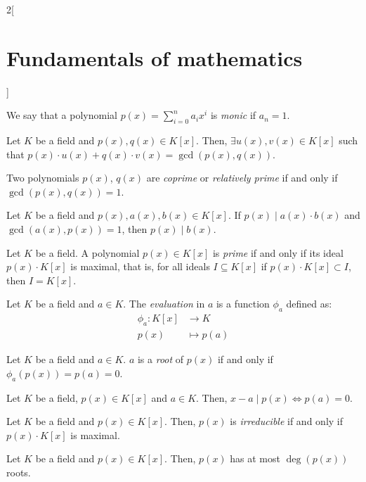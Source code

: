 \documentclass[../../../main.tex]{subfiles}
\begin{document}
\begin{multicols}{2}[\section{Fundamentals of mathematics}]
\begin{definition}
  \end{definition}
  \begin{definition}
    We say that a polynomial $p(x)=\sum_{i=0}^na_ix^i$ is \emph{monic} if $a_n=1$.
  \end{definition}
  \begin{theorem}
    Let $K$ be a field and $p(x),q(x)\in K[x]$. Then, $\exists u(x), v(x)\in K[x]$ such that $p(x)\cdot u(x)+q(x)\cdot v(x)=\gcd(p(x),q(x))$.
  \end{theorem}
  \begin{definition}
    Two polynomials $p(x)$, $q(x)$ are \emph{coprime} or \emph{relatively prime} if and only if $\gcd(p(x),q(x))=1$.
  \end{definition}
  \begin{theorem}
    Let $K$ be a field and $p(x),a(x),b(x)\in K[x]$. If $p(x)\mid a(x)\cdot b(x)$ and $\gcd(a(x),p(x))=1$, then $p(x)\mid b(x)$.
  \end{theorem}
  \begin{definition}
    Let $K$ be a field. A polynomial $p(x)\in K[x]$ is \emph{prime} if and only if its ideal $p(x)\cdot K[x]$ is maximal, that is, for all ideals $I\subseteq K[x]$ if $p(x)\cdot K[x] \subset I$, then $I=K[x]$.
  \end{definition}
  \begin{definition}
    Let $K$ be a field and $a\in K$. The \emph{evaluation} in $a$ is a function $\phi_a$ defined as:
    \begin{align*}
      \phi_a:K[x] & \longrightarrow K \\
      p(x)        & \longmapsto p(a)
    \end{align*}
  \end{definition}
  \begin{definition}
    Let $K$ be a field and $a\in K$. $a$ is a \emph{root} of $p(x)$ if and only if $\phi_a(p(x))=p(a)=0$.
  \end{definition}
  \begin{theorem}
    Let $K$ be a field, $p(x)\in K[x]$ and $a\in K$. Then, $x-a\mid p(x)\iff p(a)=0$.
  \end{theorem}
  \begin{definition}
    Let $K$ be a field and $p(x)\in K[x]$. Then, $p(x)$ is \emph{irreducible} if and only if $p(x)\cdot K[x]$ is maximal.
  \end{definition}
  \begin{theorem}
    Let $K$ be a field and $p(x)\in K[x]$. Then, $p(x)$ has at most $\deg(p(x))$ roots.

\end{theorem}
\end{multicols}
\end{document}
